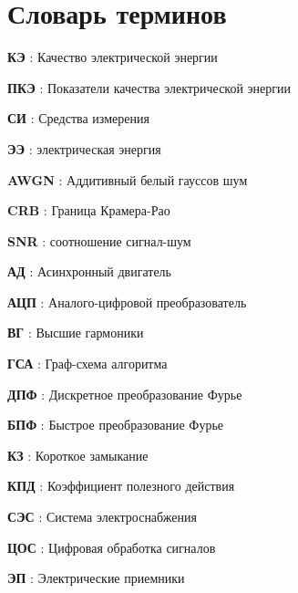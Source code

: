 \chapter*{Словарь терминов}             %

\textbf{КЭ} : Качество электрической энергии

\textbf{ПКЭ} : Показатели качества электрической энергии

\textbf{СИ} : Средства измерения

\textbf{ЭЭ} : электрическая энергия

\textbf{AWGN} : Аддитивный белый гауссов шум

\textbf{CRB} : Граница Крамера-Рао

\textbf{SNR} : соотношение сигнал-шум

\textbf{АД} : Асинхронный двигатель

\textbf{АЦП} : Аналого-цифровой преобразователь

\textbf{ВГ} : Высшие гармоники

\textbf{ГСА} : Граф-схема алгоритма 

\textbf{ДПФ} : Дискретное преобразование Фурье

\textbf{БПФ} : Быстрое преобразование Фурье

\textbf{КЗ} : Короткое замыкание

\textbf{КПД} : Коэффициент полезного действия

\textbf{СЭС} : Система электроснабжения

\textbf{ЦОС} : Цифровая обработка сигналов

\textbf{ЭП} : Электрические приемники
